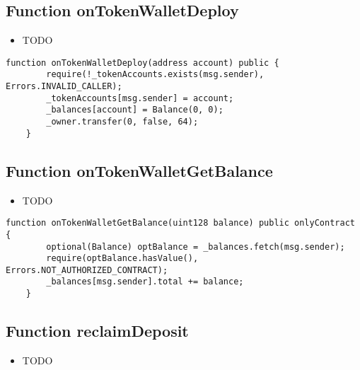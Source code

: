 \subsection{Function onTokenWalletDeploy}

\begin{itemize}
\item TODO
\end{itemize}

\begin{lstlisting}[firstnumber=237]
    function onTokenWalletDeploy(address account) public {
        require(!_tokenAccounts.exists(msg.sender), Errors.INVALID_CALLER);
        _tokenAccounts[msg.sender] = account;
        _balances[account] = Balance(0, 0);
        _owner.transfer(0, false, 64);
    }
\end{lstlisting}

\subsection{Function onTokenWalletGetBalance}

\begin{itemize}
\item TODO
\end{itemize}

\begin{lstlisting}[firstnumber=222]
    function onTokenWalletGetBalance(uint128 balance) public onlyContract {
        optional(Balance) optBalance = _balances.fetch(msg.sender);
        require(optBalance.hasValue(), Errors.NOT_AUTHORIZED_CONTRACT);
        _balances[msg.sender].total += balance;
    }
\end{lstlisting}

\subsection{Function reclaimDeposit}

\begin{itemize}
\item TODO
\end{itemize}

